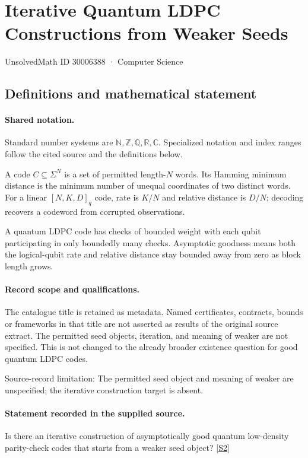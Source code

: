 \documentclass[11pt]{article}
\newcommand{\sref}[2]{\hyperlink{source:#1:#2}{[S#2]}}
\begin{document}
\setcounter{section}{30006387}
\section{Iterative Quantum LDPC Constructions from Weaker Seeds}\label{30006388}
{\small\sffamily UnsolvedMath ID 30006388 · Computer Science}
\subsection{Definitions and mathematical statement}

\paragraph{Shared notation.}Standard number systems are $\mathbb N,\mathbb Z,\mathbb Q,\mathbb R,\mathbb C$. Specialized notation and index ranges follow the cited source and the definitions below.


A code $C\subseteq\Sigma^N$ is a set of permitted length-$N$ words. Its Hamming minimum distance is the minimum number of unequal coordinates of two distinct words. For a linear $[N,K,D]_q$ code, rate is $K/N$ and relative distance is $D/N$; decoding recovers a codeword from corrupted observations.

A quantum LDPC code has checks of bounded weight with each qubit participating in only boundedly many checks. Asymptotic goodness means both the logical-qubit rate and relative distance stay bounded away from zero as block length grows.
\paragraph{Record scope and qualifications.}
The catalogue title is retained as metadata. Named certificates, contracts, bounds or frameworks in that title are not asserted as results of the original source extract.
The permitted seed objects, iteration, and meaning of weaker are not specified. This is not changed to the already broader existence question for good quantum LDPC codes.

Source-record limitation: The permitted seed object and meaning of weaker are unspecified; the iterative construction target is absent.
\paragraph{Statement recorded in the supplied source.}
Is there an iterative construction of asymptotically good quantum low-density parity-check codes that starts from a weaker seed object? \sref{30006388}{2}
\end{document}
